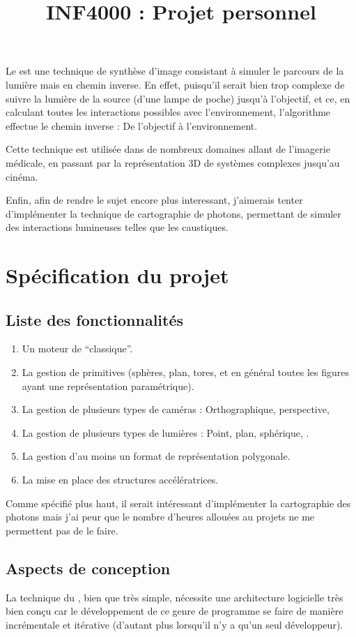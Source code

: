 \documentclass[letter]{article}
\title{INF4000 : Projet personnel}
\newcommand{\raytracing}[0]
{\tsl{ray tracing} }
\begin{document}
\maketitle

Le \raytracing est une technique de synthèse d'image consistant à simuler le
parcours de la lumière mais en chemin inverse. En effet, puisqu'il serait bien
trop complexe de suivre la lumière de la source (\eg d'une lampe de poche)
jusqu'à l'objectif, et ce, en calculant toutes les interactions possibles avec
l'environnement, l'algorithme effectue le chemin inverse : De l'objectif à
l'environnement. 

\newpar Cette technique est utilisée dans de nombreux domaines allant de
l'imagerie médicale, en passant par la représentation 3D de systèmes complexes
jusqu'au cinéma.

\newpar Enfin, afin de rendre le sujet encore plus interessant, j'aimerais
tenter d'implémenter la technique de cartographie de photons, permettant de
simuler des interactions lumineuses telles que les caustiques.

\section{Spécification du projet}
\subsection{Liste des fonctionnalités}
\begin{enumerate}
  \item Un moteur de \raytracing ``classique''.
  \item La gestion de primitives (sphères, plan, tores, et en général toutes
    les figures ayant une représentation paramétrique).
  \item La gestion de plusieurs types de caméras : Orthographique,
    perspective, \etc
  \item La gestion de plusieurs types de lumières : Point, plan, sphérique,
    \etc.
  \item La gestion d'au moins un format de représentation polygonale.
  \item La mise en place des structures accélératrices.
\end{enumerate}

Comme spécifié plus haut, il serait intéressant d'implémenter la cartographie
des photons mais j'ai peur que le nombre d'heures allouées au projets ne
me permettent pas de le faire.

\subsection{Aspects de conception}
La technique du \raytracing, bien que très simple, nécessite une architecture
logicielle très bien conçu car le développement de ce genre de programme se
faire de manière incrémentale et itérative (d'autant plus lorsqu'il n'y a
qu'un seul développeur). 
\end{document}
